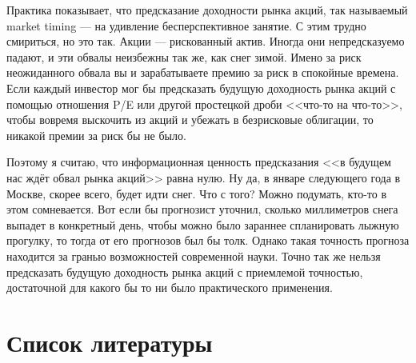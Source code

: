 Практика показывает, что предсказание доходности рынка акций, так называемый market timing --- на удивление бесперспективное занятие. С этим трудно смириться, но это так. Акции --- рискованный актив. Иногда они непредсказуемо падают, и эти обвалы неизбежны так же, как снег зимой. Имено за риск неожиданного обвала вы и зарабатываете премию за риск в спокойные времена. Если каждый инвестор мог бы предсказать будущую доходность рынка акций с помощью отношения P/E или другой простецкой дроби <<что-то на что-то>>, чтобы вовремя выскочить из акций и убежать в безрисковые облигации, то никакой премии за риск бы не было.

Поэтому я считаю, что информационная ценность предсказания <<в будущем нас ждёт обвал рынка акций>> равна нулю. Ну да, в январе следующего года в Москве, скорее всего, будет идти снег. Что с того? Можно подумать, кто-то в этом сомневается. Вот если бы прогнозист уточнил, сколько миллиметров снега выпадет в конкретный день, чтобы можно было зараннее спланировать лыжную прогулку, то тогда от его прогнозов был бы толк. Однако такая точность прогноза находится за гранью возможностей современной науки. Точно так же нельзя предсказать будущую доходность рынка акций с приемлемой точностью, достаточной для какого бы то ни было практического применения.

\section*{Список литературы}
\en{
\printbibliography[heading = none]
}


